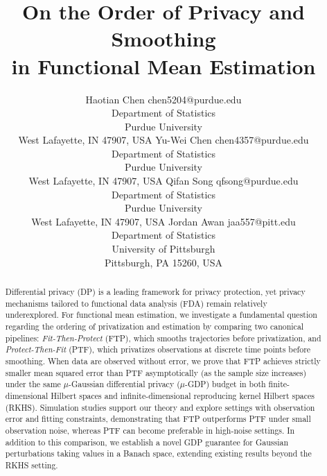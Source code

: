 \documentclass[twoside,11pt]{article}
\begin{document}
\title{On the Order of Privacy and Smoothing\\ in Functional Mean Estimation}

\author{\name Haotian Chen \email chen5204@purdue.edu \\
       \addr Department of Statistics\\
       Purdue University\\
       West Lafayette, IN 47907, USA
       \AND
       \name Yu-Wei Chen \email chen4357@purdue.edu \\
       \addr Department of Statistics\\
       Purdue University\\
       West Lafayette, IN 47907, USA
       \AND
       \name Qifan Song \email qfsong@purdue.edu \\
       \addr Department of Statistics\\
       Purdue University\\
       West Lafayette, IN 47907, USA
       \AND
       \name Jordan Awan \email jaa557@pitt.edu \\
       \addr Department of Statistics\\
       University of Pittsburgh\\
       Pittsburgh, PA 15260, USA}
       
\editor{}

\maketitle

\begin{abstract}
Differential privacy (DP) is a leading framework for privacy protection, yet privacy mechanisms tailored to functional data analysis (FDA) remain relatively underexplored. For functional mean estimation, we investigate a fundamental question regarding the ordering of privatization and estimation by comparing two canonical pipelines: \emph{Fit-Then-Protect} (FTP), which smooths trajectories before privatization, and \emph{Protect-Then-Fit} (PTF), which privatizes observations at discrete time points before smoothing. When data are observed without error, we prove that FTP achieves strictly smaller mean squared error than PTF asymptotically (as the sample size increases) under the same $\mu$-Gaussian differential privacy ($\mu$-GDP) budget in both finite-dimensional Hilbert spaces and infinite-dimensional reproducing kernel Hilbert spaces (RKHS). Simulation studies support our theory and explore settings with observation error and fitting constraints, demonstrating that FTP outperforms PTF under small observation noise, whereas PTF can become preferable in high-noise settings. In addition to this comparison, we establish a novel GDP guarantee for Gaussian perturbations taking values in a Banach space, extending existing results beyond the RKHS setting.
\end{abstract}
\end{document}
